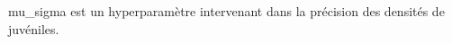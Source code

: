 \documentclass[a4paper]{article}
\begin{document}
mu\_sigma est un hyperparamètre intervenant dans la précision des densités de
juvéniles.

\clearpage


%
%
%
%


%
%
%
%


%
%
\end{document}
